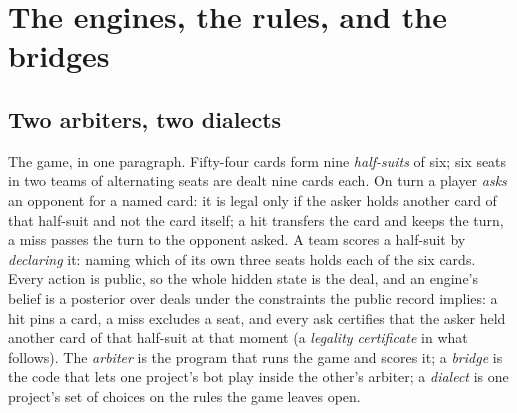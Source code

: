 \documentclass[11pt]{article}
\begin{document}
\begin{table}[!ht]
\caption{The claim against the measurements. Left: the paper's headline, from its own results file.
Middle: the same pairing in FishLab's arbiter under FishLab's rules. Right: the same pairing in KV's
arbiter after the one-line repair of Section~\ref{sec:defect}, on fresh deals.}
\label{tab:claims}
\small

\end{table}

\section{The engines, the rules, and the bridges}
\label{sec:setup}

\subsection{Two arbiters, two dialects}

The game, in one paragraph. Fifty-four cards form nine \emph{half-suits} of six; six seats in two
teams of alternating seats are dealt nine cards each. On turn a player \emph{asks} an opponent for a
named card: it is legal only if the asker holds another card of that half-suit and not the card
itself; a hit transfers the card and keeps the turn, a miss passes the turn to the opponent asked. A
team scores a half-suit by \emph{declaring} it: naming which of its own three seats holds each of the
six cards. Every action is public, so the whole hidden state is the deal, and an engine's belief is a
posterior over deals under the constraints the public record implies: a hit pins a card, a miss
excludes a seat, and every ask certifies that the asker held another card of that half-suit at that
moment (a \emph{legality certificate} in what follows). The \emph{arbiter} is the program that runs
the game and scores it; a \emph{bridge} is the code that lets one project's bot play inside the
other's arbiter; a \emph{dialect} is one project's set of choices on the rules the game leaves open.
\end{document}
